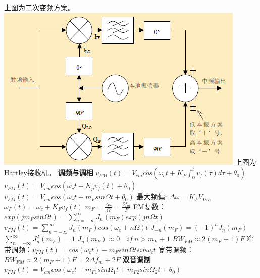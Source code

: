\documentclass[10.5pt,landscape]{article}
\begin{document}
\begin{multicols*}{4}
   上图为二次变频方案。\newline
   \includegraphics[scale=0.5]{Hartley}\newline
   上图为Hartley接收机。\newline
\textbf{调频与调相}
$v_{FM}(t) = V_{cm}cos(\omega_c t + K_F \int_0^t v_f(\tau)d\tau + \theta_0)$\newline
$v_{PM}(t) = V_{cm}cos(\omega_ct + K_pv_f(t) +\theta_0) $ \newline
$v_{FM}(t) = V_{cm}cos(\omega_c t + m_Fsin\Omega t + \theta_0)$ \newline
最大频偏: $ \Delta \omega = K_F V_{\Omega m}  $ \newline
$\omega_F(t) = \omega_c + K_Fv_f(t)$ \newline
 $m_F = \frac{\Delta \omega}{\Omega} = \frac{\delta f_m}{F}$ \newline
 FM复数：$exp(jm_Fsin\Omega t) = \sum_{n=-\infty}^{\infty} J_n(m_F)exp(jn\Omega t)$\newline
 $v_{FM}(t) = \sum_{n=-\infty}^{\infty}J_n(m_F)cos(\omega_c + n\Omega) t$ \newline
$J_{-n}(m_F) = (-1)^n J_n(m_F)$ \newline
$\sum_{n=-\infty}^{\infty}J_n^2(m_F) = 1$\newline
$J_n(m_F) \approx 0 \quad  if \  n > m_F + 1$ \newline
$BW_{FM} \approx 2(m_F + 1)F$ \newline 
窄带调频：$v_{FM}(t) = cos(\omega_c t ) - m_Fsin\Omega t sin\omega_ct$ \newline
宽带调频：$BW_{FM} \approx 2(m_F + 1)F = 2\Delta f_m + 2F$ \newline
\textbf{双音调制}\newline
$v_{FM}(t) = V_{cm}cos(\omega_c t + m_{F1}sin\Omega_1 t + m_{F2}sin\Omega_2 t + \theta_0)$\newline

\end{multicols*}
\end{document}

